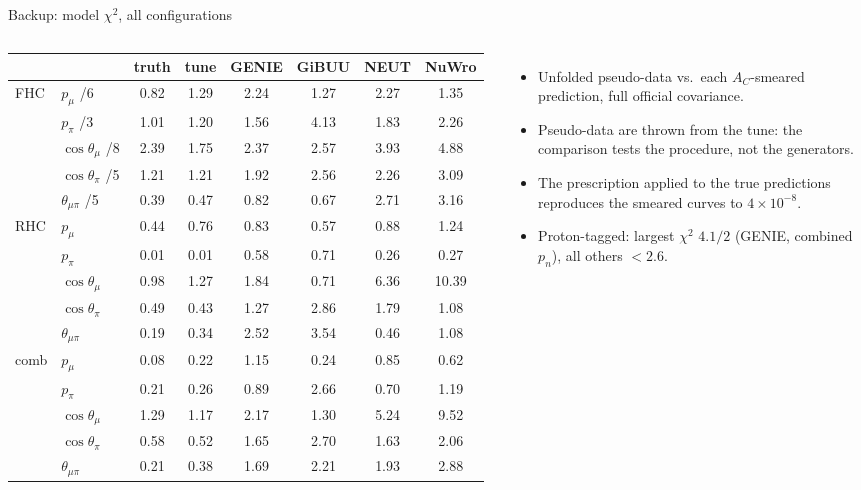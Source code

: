 \documentclass[aspectratio=169,10pt]{beamer}
\begin{document}
\begin{frame}{Backup: model $\chi^2$, all configurations}
  \begin{columns}[T]
  \scriptsize\centering\setlength{\tabcolsep}{2.5pt}
  \begin{tabular}{llcccccc}
    \toprule
    & & truth & tune & GENIE & GiBUU & NEUT & NuWro \\\midrule
    FHC & $p_\mu$ /6 & 0.82 & 1.29 & 2.24 & 1.27 & 2.27 & 1.35 \\
     & $p_\pi$ /3 & 1.01 & 1.20 & 1.56 & 4.13 & 1.83 & 2.26 \\
     & $\cos\theta_\mu$ /8 & 2.39 & 1.75 & 2.37 & 2.57 & 3.93 & 4.88 \\
     & $\cos\theta_\pi$ /5 & 1.21 & 1.21 & 1.92 & 2.56 & 2.26 & 3.09 \\
     & $\theta_{\mu\pi}$ /5 & 0.39 & 0.47 & 0.82 & 0.67 & 2.71 & 3.16 \\\midrule
    RHC & $p_\mu$ & 0.44 & 0.76 & 0.83 & 0.57 & 0.88 & 1.24 \\
     & $p_\pi$ & 0.01 & 0.01 & 0.58 & 0.71 & 0.26 & 0.27 \\
     & $\cos\theta_\mu$ & 0.98 & 1.27 & 1.84 & 0.71 & 6.36 & 10.39 \\
     & $\cos\theta_\pi$ & 0.49 & 0.43 & 1.27 & 2.86 & 1.79 & 1.08 \\
     & $\theta_{\mu\pi}$ & 0.19 & 0.34 & 2.52 & 3.54 & 0.46 & 1.08 \\\midrule
    comb & $p_\mu$ & 0.08 & 0.22 & 1.15 & 0.24 & 0.85 & 0.62 \\
     & $p_\pi$ & 0.21 & 0.26 & 0.89 & 2.66 & 0.70 & 1.19 \\
     & $\cos\theta_\mu$ & 1.29 & 1.17 & 2.17 & 1.30 & 5.24 & 9.52 \\
     & $\cos\theta_\pi$ & 0.58 & 0.52 & 1.65 & 2.70 & 1.63 & 2.06 \\
     & $\theta_{\mu\pi}$ & 0.21 & 0.38 & 1.69 & 2.21 & 1.93 & 2.88 \\
    \bottomrule
  \end{tabular}
  \scriptsize
  \begin{itemize}\setlength\itemsep{2pt}
    \item Unfolded pseudo-data vs.\ each $A_C$-smeared prediction, full official covariance.
    \item Pseudo-data are thrown from the tune: the comparison tests the procedure, not the generators.
    \item The prescription applied to the true predictions reproduces the smeared curves to $4\times10^{-8}$.
    \item Proton-tagged: largest $\chi^2$ $4.1/2$ (GENIE, combined $p_n$), all others $<2.6$.
  \end{itemize}
  \end{columns}
\end{frame}
\end{document}
